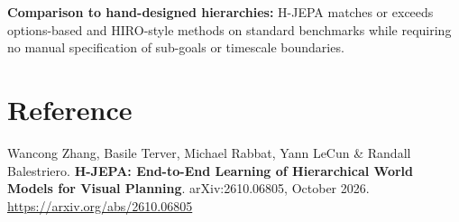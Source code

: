 \documentclass[10pt,twocolumn]{article}
\begin{document}
\textbf{Comparison to hand-designed hierarchies:} H-JEPA matches or exceeds
options-based and HIRO-style methods on standard benchmarks while requiring
no manual specification of sub-goals or timescale boundaries.

\section*{Reference}

Wancong Zhang, Basile Terver, Michael Rabbat, Yann LeCun \& Randall
Balestriero.
\textbf{H-JEPA: End-to-End Learning of Hierarchical World Models for
Visual Planning}.
arXiv:2610.06805, October 2026.\\
\url{https://arxiv.org/abs/2610.06805}
\end{document}
